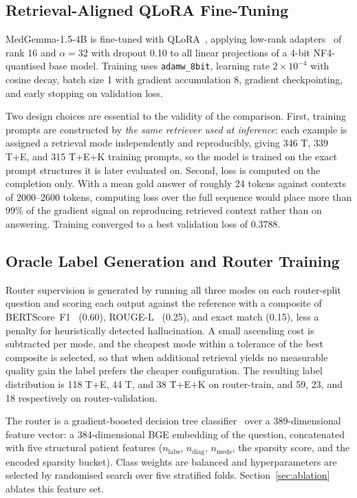 \documentclass[conference]{IEEEtran}
\begin{document}
\subsection{Retrieval-Aligned QLoRA Fine-Tuning}

MedGemma-1.5-4B is fine-tuned with QLoRA~\cite{dettmers2023}, applying
low-rank adapters~\cite{hu2022} of rank 16 and $\alpha = 32$ with
dropout 0.10 to all linear projections of a 4-bit NF4-quantised base
model. Training uses \texttt{adamw\_8bit}, learning rate
$2\times10^{-4}$ with cosine decay, batch size 1 with gradient
accumulation 8, gradient checkpointing, and early stopping on
validation loss.

Two design choices are essential to the validity of the comparison.
First, training prompts are constructed by \textit{the same retriever
used at inference}: each example is assigned a retrieval mode
independently and reproducibly, giving 346 T, 339 T+E, and 315 T+E+K
training prompts, so the model is trained on the exact prompt
structures it is later evaluated on. Second, loss is computed on the
completion only. With a mean gold answer of roughly 24 tokens against
contexts of 2000--2600 tokens, computing loss over the full sequence
would place more than 99\% of the gradient signal on reproducing
retrieved context rather than on answering. Training converged to a
best validation loss of 0.3788.

\subsection{Oracle Label Generation and Router Training}

Router supervision is generated by running all three modes on each
router-split question and scoring each output against the reference
with a composite of BERTScore~F1~\cite{zhang2020} (0.60),
ROUGE-L~\cite{lin2004} (0.25), and exact match (0.15), less a penalty
for heuristically detected hallucination. A small ascending cost is subtracted per mode, and the
cheapest mode within a tolerance of the best composite is selected, so
that when additional retrieval yields no measurable quality gain the
label prefers the cheaper configuration. The resulting label
distribution is 118 T+E, 44 T, and 38 T+E+K on router-train, and 59,
23, and 18 respectively on router-validation.

The router is a gradient-boosted decision tree
classifier~\cite{chen2016} over a 389-dimensional feature vector: a
384-dimensional BGE embedding of the question, concatenated with five
structural patient features ($n_{\text{labs}}$, $n_{\text{diag}}$,
$n_{\text{meds}}$, the sparsity score, and the encoded sparsity
bucket). Class weights are balanced and hyperparameters are selected
by randomised search over five stratified folds. Section~\ref{sec:ablation}
ablates this feature set.
\end{document}
